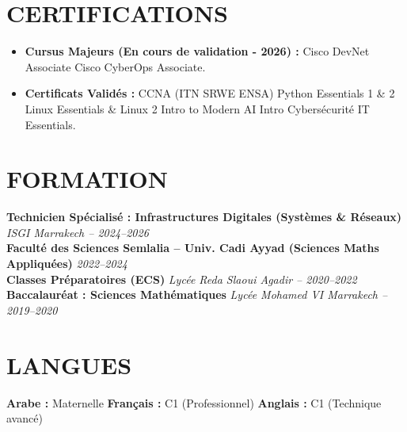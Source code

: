\documentclass[10pt,a4paper]{article}
\begin{document}
\section*{CERTIFICATIONS}
\begin{itemize}[leftmargin=*, itemsep=0.8pt, parsep=0pt, topsep=1.0pt]
    \item \textbf{Cursus Majeurs (En cours de validation - 2026) :} Cisco DevNet Associate \textbar{} Cisco CyberOps Associate.
    \item \textbf{Certificats Validés :} CCNA (ITN \textbar{} SRWE \textbar{} ENSA) \textbar{} Python Essentials 1 \& 2 \textbar{} Linux Essentials \& Linux 2 \textbar{} Intro to Modern AI \textbar{} Intro Cybersécurité \textbar{} IT Essentials.
\end{itemize}

\section*{FORMATION}
\noindent \textbf{Technicien Spécialisé : Infrastructures Digitales (Systèmes \& Réseaux)} \hfill \textit{ISGI Marrakech -- 2024--2026}\\
\noindent \textbf{Faculté des Sciences Semlalia -- Univ. Cadi Ayyad (Sciences Maths Appliquées)} \hfill \textit{2022--2024}\\
\noindent \textbf{Classes Préparatoires (ECS)} \hfill \textit{Lycée Reda Slaoui Agadir -- 2020--2022}\\
\noindent \textbf{Baccalauréat : Sciences Mathématiques} \hfill \textit{Lycée Mohamed VI Marrakech -- 2019--2020}

\section*{LANGUES}
\noindent \textbf{Arabe :} Maternelle \quad \textbar \quad \textbf{Français :} C1 (Professionnel) \quad \textbar \quad \textbf{Anglais :} C1 (Technique avancé)
\end{document}
